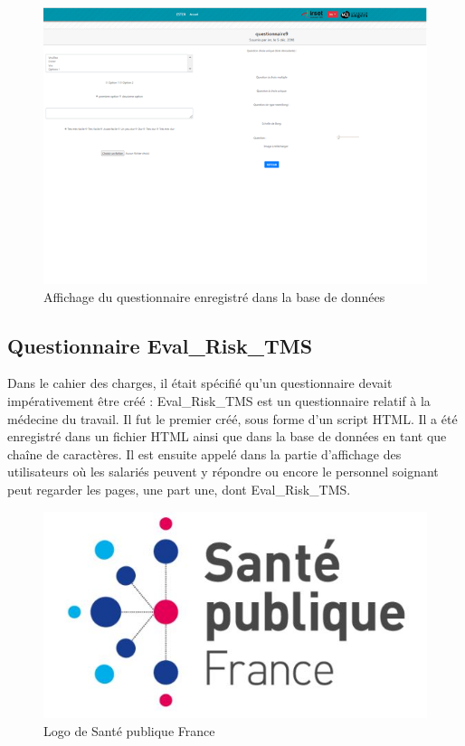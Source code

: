 \begin{figure}[H]
    \begin{center}
	\includegraphics[scale=0.7]{img/questionnaire/affichage}
    \end{center}
    \caption{Affichage du questionnaire enregistré dans la base de données}
\end{figure}

\subsection{Questionnaire Eval\_Risk\_TMS}

Dans le cahier des charges, il était spécifié qu'un questionnaire devait impérativement être créé : Eval\_Risk\_TMS est un questionnaire relatif à la médecine du travail. Il fut le premier créé, sous forme d'un script HTML. Il a été enregistré dans un fichier HTML ainsi que dans la base de données en tant que chaîne de caractères.
Il est ensuite appelé dans la partie d'affichage des utilisateurs où les salariés peuvent y répondre ou encore le personnel soignant peut regarder les pages, une part une, dont Eval\_Risk\_TMS.

\begin{figure}[H]
    \begin{center}
	\includegraphics[scale=0.4]{img/Sante}
    \end{center}
    \caption{Logo de Santé publique France}
\end{figure}